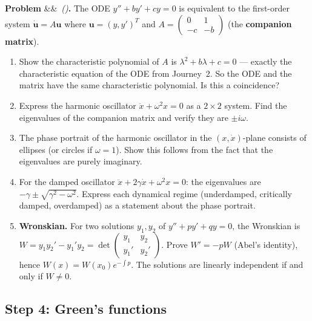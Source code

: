 \documentclass[12pt,a4paper]{article}
\newcounter{problem}
\newenvironment{problem}[1][]{\refstepcounter{problem}\par\vspace{6pt}\noindent\textbf{\color{MidBlue}Problem \theproblem}\ifx&#1&\else\ \textit{(#1)}\fi\textbf{.}\enskip}{\par\vspace{4pt}}
\begin{document}
\begin{problem}
\label{prob:second_order_LA}
The ODE $y'' + by' + cy = 0$ is equivalent to the first-order system $\dot{\mathbf{u}} = A\mathbf{u}$ where $\mathbf{u} = (y,y')^T$ and $A = \begin{pmatrix}0&1\\-c&-b\end{pmatrix}$ (the \textbf{companion matrix}).

\begin{enumerate}[label=(\alph*),topsep=2pt]
  \item Show the characteristic polynomial of $A$ is $\lambda^2+b\lambda+c = 0$ --- exactly the characteristic equation of the ODE from Journey~2. So the ODE and the matrix have the same characteristic polynomial. Is this a coincidence?
  \item Express the harmonic oscillator $\ddot{x}+\omega^2 x=0$ as a $2\times2$ system. Find the eigenvalues of the companion matrix and verify they are $\pm i\omega$.
  \item The phase portrait of the harmonic oscillator in the $(x,\dot{x})$-plane consists of ellipses (or circles if $\omega=1$). Show this follows from the fact that the eigenvalues are purely imaginary.
  \item For the damped oscillator $\ddot{x}+2\gamma\dot{x}+\omega^2 x=0$: the eigenvalues are $-\gamma\pm\sqrt{\gamma^2-\omega^2}$. Express each dynamical regime (underdamped, critically damped, overdamped) as a statement about the phase portrait.
  \item \textbf{Wronskian.} For two solutions $y_1,y_2$ of $y''+py'+qy=0$, the Wronskian is $W = y_1y_2'-y_1'y_2 = \det\begin{pmatrix}y_1&y_2\\y_1'&y_2'\end{pmatrix}$. Prove $W' = -pW$ (Abel's identity), hence $W(x) = W(x_0)e^{-\int p}$. The solutions are linearly independent if and only if $W\neq 0$.
\end{enumerate}
\end{problem}

\subsection{Step 4: Green's functions}
\end{document}
